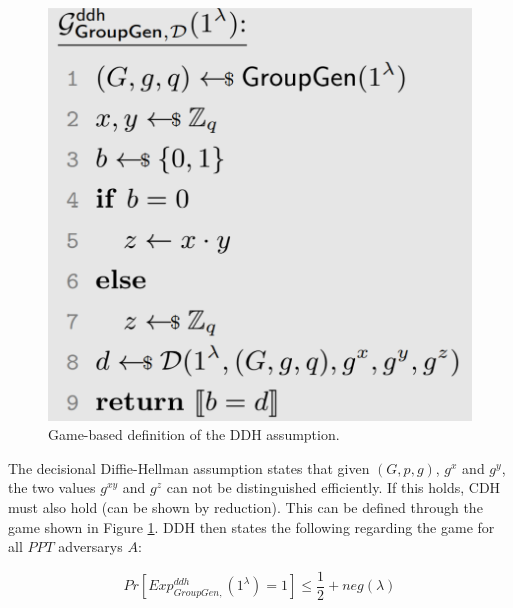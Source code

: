 \begin{figure}
    \center
    \includegraphics[width=\linewidth]{gfx/DDH_assumption.png}
    \caption{Game-based definition of the DDH assumption.}
    \label{fig:DDH_assumption}
\end{figure}

The decisional Diffie-Hellman assumption states that given $(G,p,g)$, $g^x$ and $g^y$, the two values $g^{xy}$ and $g^z$ can not be distinguished efficiently.
If this holds, CDH must also hold (can be shown by reduction).
This can be defined through the game shown in Figure \ref{fig:DDH_assumption}.
DDH then states the following regarding the game for all $PPT$ adversarys $A$:

$$
    Pr[Exp_{GroupGen,}^{ddh}(1^\lambda) = 1] \leq \frac{1}{2} + neg(\lambda)
$$

